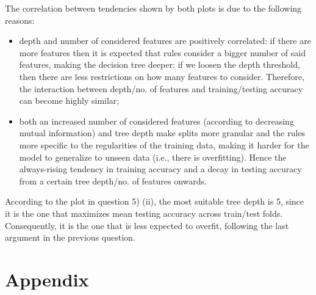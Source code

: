 \documentclass{exam}
\begin{document}
\begin{questions}
\begin{parts}
\begin{figure}[H]
            \end{figure}
        \end{parts}
        \item The correlation between tendencies shown by both plots is due to the following reasons:
        \vspace{-0.4em}
        \begin{itemize}
            \item depth and number of considered features are positively correlated: if there are more features then it is expected that rules consider a bigger number of said features, making the decision tree deeper; if we loosen the depth threshold, then there are less restrictions on how many features to consider. Therefore, the interaction between depth/no. of features and training/testing accuracy can become highly similar;
            \item both an increased number of considered features (according to decreasing mutual information) and tree depth make splits more granular and the rules more specific to the regularities of the training data, making it harder for the model to generalize to unseen data (i.e., there is overfitting). Hence the always-rising tendency in training accuracy and a decay in testing accuracy from a certain tree depth/no. of features onwards.
        \end{itemize}
        \item According to the plot in question 5) (ii), the most suitable tree depth is 5, since it is the one that maximizes mean testing accuracy across train/test folds. Consequently, it is the one that is less expected to overfit, following the last argument in the previous question. 
    \end{questions}
    \pagebreak
    \section{Appendix}
    \inputminted{python}{src/ex02.py}
    
    
\end{document}
